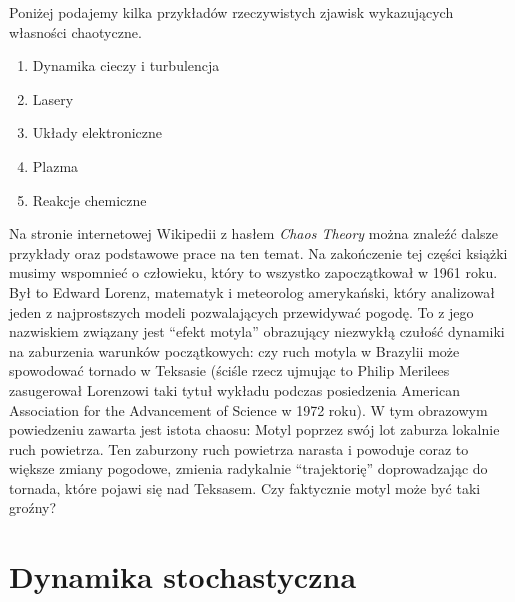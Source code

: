 \documentclass[a4paper,12pt,polish]{sphinxmanual}
\begin{document}
Poniżej podajemy kilka przykładów rzeczywistych zjawisk wykazujących własności chaotyczne.
\begin{enumerate}
\item {} 
Dynamika cieczy i turbulencja

\item {} 
Lasery

\item {} 
Układy elektroniczne

\item {} 
Plazma

\item {} 
Reakcje chemiczne

\end{enumerate}

Na stronie internetowej Wikipedii  z hasłem \emph{Chaos Theory}  można znaleźć dalsze przykłady oraz podstawowe prace na ten temat. Na zakończenie tej części książki musimy wspomnieć o człowieku, który to wszystko zapoczątkował w 1961 roku. Był to Edward Lorenz, matematyk i meteorolog amerykański,  który analizował jeden z najprostszych modeli pozwalających przewidywać pogodę. To z jego nazwiskiem związany jest  ``efekt motyla'' obrazujący niezwykłą czułość dynamiki na zaburzenia warunków  początkowych: czy ruch motyla w Brazylii może spowodować tornado w Teksasie (ściśle rzecz ujmując to Philip Merilees zasugerował  Lorenzowi taki tytuł wykładu podczas posiedzenia American Association for the Advancement of Science w 1972 roku). W tym obrazowym powiedzeniu zawarta jest istota chaosu: Motyl poprzez swój lot zaburza lokalnie ruch powietrza. Ten zaburzony ruch powietrza narasta i powoduje coraz to większe zmiany pogodowe, zmienia radykalnie ``trajektorię''  doprowadzając do tornada, które pojawi się nad Teksasem. Czy faktycznie motyl może być  taki groźny?


\chapter{Dynamika stochastyczna}
\label{index:id1}
\end{document}
